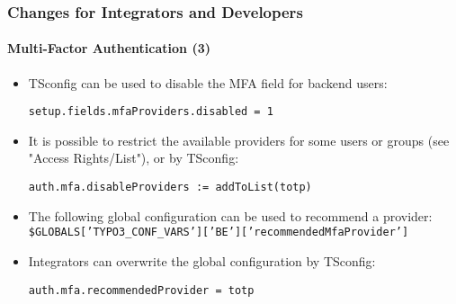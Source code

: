 %

\begin{frame}[fragile]
	\frametitle{Changes for Integrators and Developers}
	\framesubtitle{Multi-Factor Authentication (3)}


	\begin{itemize}
		\item TSconfig can be used to disable the MFA field for backend users:
\begin{lstlisting}
setup.fields.mfaProviders.disabled = 1
\end{lstlisting}

		\item It is possible to restrict the available providers for some users
			or groups (see "Access Rights/List"), or by TSconfig:
\begin{lstlisting}
auth.mfa.disableProviders := addToList(totp)
\end{lstlisting}

		\item The following global configuration can be used to recommend a provider:\newline
			\smaller\texttt{\$GLOBALS['TYPO3\_CONF\_VARS']['BE']['recommendedMfaProvider']}\normalsize

		\item Integrators can overwrite the global configuration by TSconfig:
\begin{lstlisting}
auth.mfa.recommendedProvider = totp
\end{lstlisting}

	\end{itemize}

\end{frame}

